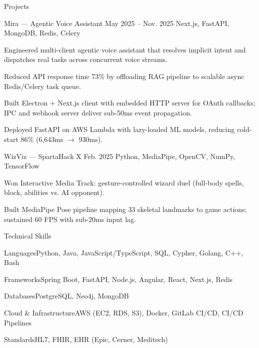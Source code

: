 \documentclass[
	11pt
]{../../../resume}
\begin{document}
	\begin{rSection}{P}{rojects}
		\begin{rSectionEntry}
			{Mira --- Agentic Voice Assistant}
			{May 2025 -- Nov. 2025}
			{}
			{Next.js, FastAPI, MongoDB, Redis, Celery}
			{}

			\item Engineered multi-client agentic voice assistant that resolves implicit intent and dispatches real tasks across concurrent voice streams.
			\item Reduced API response time 73\% by offloading RAG pipeline to scalable async Redis/Celery task queue.
			\item Built Electron + Next.js client with embedded HTTP server for OAuth callbacks; IPC and webhook server deliver sub-50ms event propagation.
			\item Deployed FastAPI on AWS Lambda with lazy-loaded ML models, reducing cold-start 86\% (6{,}643ms $\rightarrow$ 930ms).
		\end{rSectionEntry}

		\begin{rSectionEntry}
			{WizViz --- SpartaHack X}
			{Feb. 2025}
			{}
			{Python, MediaPipe, OpenCV, NumPy, TensorFlow}
			{}

			\item Won Interactive Media Track: gesture-controlled wizard duel (full-body spells, block, abilities vs. AI opponent).
			\item Built MediaPipe Pose pipeline mapping 33 skeletal landmarks to game actions; sustained 60 FPS with sub-20ms input lag.
		\end{rSectionEntry}
	\end{rSection}

	\begin{rSection}{T}{echnical Skills}
		\begin{rSet}{Languages}{Python, Java, JavaScript/TypeScript, SQL, Cypher, Golang, C++, Bash}
		\end{rSet}
		\begin{rSet}{Frameworks}{Spring Boot, FastAPI, Node.js, Angular, React, Next.js, Redis}
		\end{rSet}
		\begin{rSet}{Databases}{PostgreSQL, Neo4j, MongoDB}
		\end{rSet}
		\begin{rSet}{Cloud \& Infrastructure}{AWS (EC2, RDS, S3), Docker, GitLab CI/CD, CI/CD Pipelines}
		\end{rSet}
		\begin{rSet}{Standards}{HL7, FHIR, EHR (Epic, Cerner, Meditech)}
		\end{rSet}
	\end{rSection}
\end{document}
